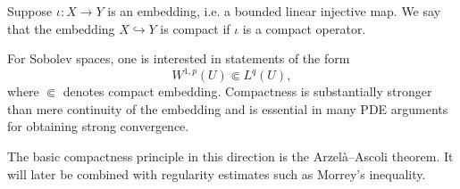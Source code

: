 \begin{definition}
Suppose $\iota:X\to Y$ is an embedding, i.e. a bounded linear injective map. We say that the embedding $X\hookrightarrow Y$ is compact if $\iota$ is a compact operator.
\end{definition}

\begin{remark}
For Sobolev spaces, one is interested in statements of the form
\[
W^{1,p}(U) \Subset L^q(U),
\]
where $\Subset$ denotes compact embedding. Compactness is substantially stronger than mere continuity of the embedding and is essential in many PDE arguments for obtaining strong convergence.
\end{remark}

\begin{remark}
The basic compactness principle in this direction is the Arzel\`a--Ascoli theorem. It will later be combined with regularity estimates such as Morrey's inequality.
\end{remark}

